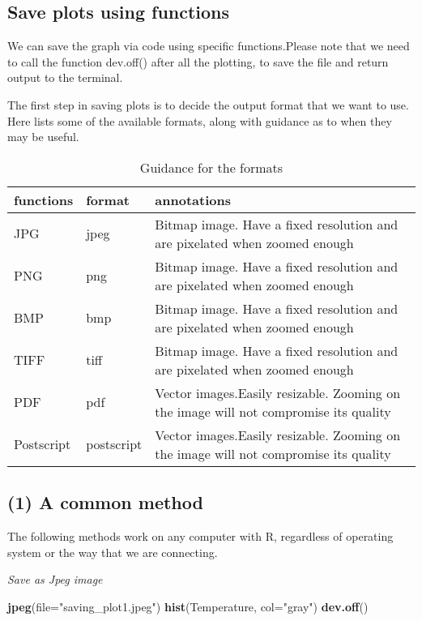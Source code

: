 \documentclass[]{book}
\newenvironment{Shaded}{\begin{snugshade}}{\end{snugshade}}
\newcommand{\KeywordTok}[1]{\textcolor[rgb]{0.13,0.29,0.53}{\textbf{#1}}}
\newcommand{\DataTypeTok}[1]{\textcolor[rgb]{0.13,0.29,0.53}{#1}}
\newcommand{\StringTok}[1]{\textcolor[rgb]{0.31,0.60,0.02}{#1}}
\newcommand{\NormalTok}[1]{#1}
\theoremstyle{definition}
\theoremstyle{definition}
\theoremstyle{definition}
\theoremstyle{remark}
\begin{document}
\subsection{Save plots using
functions}\label{save-plots-using-functions}

We can save the graph via code using specific functions.Please note that
we need to call the function dev.off() after all the plotting, to save
the file and return output to the terminal.

The first step in saving plots is to decide the output format that we
want to use. Here lists some of the available formats, along with
guidance as to when they may be useful.

\begin{table}

\caption{\label{tab:unnamed-chunk-130}Guidance for the formats}
\centering
\begin{tabular}[t]{l|l|l}
\hline
functions & format & annotations\\
\hline
JPG & jpeg & Bitmap image. Have a fixed resolution and are pixelated when zoomed enough\\
\hline
PNG & png & Bitmap image. Have a fixed resolution and are pixelated when zoomed enough\\
\hline
BMP & bmp & Bitmap image. Have a fixed resolution and are pixelated when zoomed enough\\
\hline
TIFF & tiff & Bitmap image. Have a fixed resolution and are pixelated when zoomed enough\\
\hline
PDF & pdf & Vector images.Easily resizable. Zooming on the image will not compromise its quality\\
\hline
Postscript & postscript & Vector images.Easily resizable. Zooming on the image will not compromise its quality\\
\hline
\end{tabular}
\end{table}

\subsection{(1) A common method}\label{a-common-method}

The following methods work on any computer with R, regardless of
operating system or the way that we are connecting.

\emph{Save as Jpeg image}

\begin{Shaded}
\begin{Highlighting}[]
\KeywordTok{jpeg}\NormalTok{(}\DataTypeTok{file=}\StringTok{"saving_plot1.jpeg"}\NormalTok{)}
\KeywordTok{hist}\NormalTok{(Temperature, }\DataTypeTok{col=}\StringTok{"gray"}\NormalTok{)}
\KeywordTok{dev.off}\NormalTok{()}
\end{Highlighting}
\end{Shaded}
\end{document}
